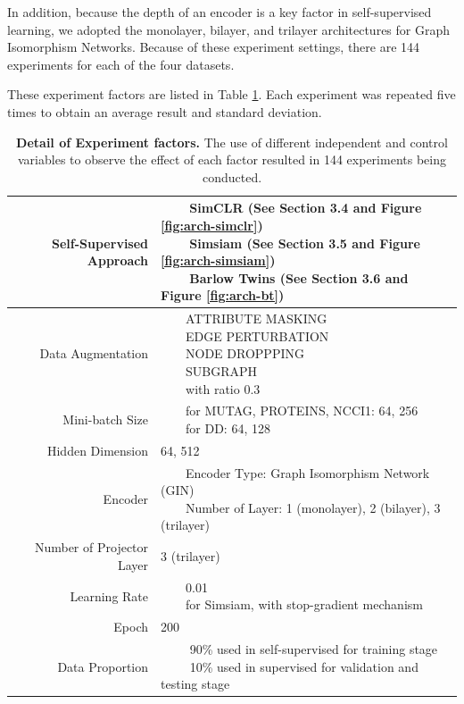 In addition, because the depth of an encoder is a key factor in self-supervised learning, we adopted the monolayer, bilayer, and trilayer architectures for Graph Isomorphism Networks. Because of these experiment settings, there are 144 experiments for each of the four datasets.

These experiment factors are listed in Table \ref{tab:expfactor}. Each experiment was repeated five times to obtain an average result and standard deviation.


\begin{table}[!htbp]
\centering
\begin{tabular}{r|l}
\toprule
Self-Supervised Approach & \makecell[l]{
~~\llap{\textbullet}~~SimCLR (See Section 3.4 and Figure \ref{fig:arch-simclr}) \\
~~\llap{\textbullet}~~Simsiam (See Section 3.5 and Figure \ref{fig:arch-simsiam})\\
~~\llap{\textbullet}~~Barlow Twins (See Section 3.6 and Figure \ref{fig:arch-bt})} \\
\midrule
Data Augmentation & \makecell[l]{
~~\llap{\textbullet}~~\uppercase{attribute masking}\\
~~\llap{\textbullet}~~\uppercase{edge perturbation} \\
~~\llap{\textbullet}~~\uppercase{node droppping}\\
~~\llap{\textbullet}~~\uppercase{subgraph}\\
~~\llap{\textbullet}~~with ratio 0.3} \\
\midrule
Mini-batch Size & \makecell[l]{
~~\llap{\textbullet}~~for MUTAG, PROTEINS, NCCI1: 64, 256\\
~~\llap{\textbullet}~~for DD: 64, 128}\\
\midrule
Hidden Dimension & 64, 512\\
\midrule
Encoder & \makecell[l]{~~\llap{\textbullet}~~Encoder Type: Graph Isomorphism Network (GIN)\\
~~\llap{\textbullet}~~Number of Layer: 1 (monolayer), 2 (bilayer), 3 (trilayer)} \\
\midrule
Number of Projector Layer & 3 (trilayer)\\
\midrule
Learning Rate & \makecell[l]{~~\llap{\textbullet}~~0.01\\
~~\llap{\textbullet}~~for Simsiam, with stop-gradient mechanism}\\
\midrule
Epoch  & 200\\
\midrule
Data Proportion & \makecell[l]{
~~\llap{\textbullet}~~ 90\% used in self-supervised for training stage\\
~~\llap{\textbullet}~~ 10\% used in supervised for validation and testing stage}
\\


\bottomrule
\end{tabular}
\vspace{0.5cm}
\caption[Detail of experiment factors]{\textbf{Detail of Experiment factors.} The use of different independent and control variables to observe the effect of each factor resulted in 144 experiments being conducted.}
		\label{tab:expfactor}
	\end{table}


